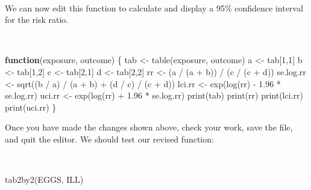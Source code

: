 \documentclass[
  12pt,
  a4paper]{book}
\newenvironment{Shaded}{\begin{snugshade}}{\end{snugshade}}
\newcommand{\ControlFlowTok}[1]{\textcolor[rgb]{0.13,0.29,0.53}{\textbf{#1}}}
\newcommand{\DecValTok}[1]{\textcolor[rgb]{0.00,0.00,0.81}{#1}}
\newcommand{\FloatTok}[1]{\textcolor[rgb]{0.00,0.00,0.81}{#1}}
\newcommand{\FunctionTok}[1]{\textcolor[rgb]{0.00,0.00,0.00}{#1}}
\newcommand{\NormalTok}[1]{#1}
\newcommand{\OtherTok}[1]{\textcolor[rgb]{0.56,0.35,0.01}{#1}}
\newcommand{\SpecialCharTok}[1]{\textcolor[rgb]{0.00,0.00,0.00}{#1}}
\begin{document}
~

We can now edit this function to calculate and display a 95\% confidence interval for the risk ratio.

~

\begin{Shaded}
\begin{Highlighting}[]
\ControlFlowTok{function}\NormalTok{(exposure, outcome) \{}
\NormalTok{  tab }\OtherTok{\textless{}{-}} \FunctionTok{table}\NormalTok{(exposure, outcome)}
\NormalTok{  a }\OtherTok{\textless{}{-}}\NormalTok{ tab[}\DecValTok{1}\NormalTok{,}\DecValTok{1}\NormalTok{]}
\NormalTok{  b }\OtherTok{\textless{}{-}}\NormalTok{ tab[}\DecValTok{1}\NormalTok{,}\DecValTok{2}\NormalTok{]}
\NormalTok{  c }\OtherTok{\textless{}{-}}\NormalTok{ tab[}\DecValTok{2}\NormalTok{,}\DecValTok{1}\NormalTok{]}
\NormalTok{  d }\OtherTok{\textless{}{-}}\NormalTok{ tab[}\DecValTok{2}\NormalTok{,}\DecValTok{2}\NormalTok{]}
\NormalTok{  rr }\OtherTok{\textless{}{-}}\NormalTok{ (a }\SpecialCharTok{/}\NormalTok{ (a }\SpecialCharTok{+}\NormalTok{ b)) }\SpecialCharTok{/}\NormalTok{ (c }\SpecialCharTok{/}\NormalTok{ (c }\SpecialCharTok{+}\NormalTok{ d))}
\NormalTok{  se.log.rr }\OtherTok{\textless{}{-}} \FunctionTok{sqrt}\NormalTok{((b }\SpecialCharTok{/}\NormalTok{ a) }\SpecialCharTok{/}\NormalTok{ (a }\SpecialCharTok{+}\NormalTok{ b) }\SpecialCharTok{+}\NormalTok{ (d }\SpecialCharTok{/}\NormalTok{ c) }\SpecialCharTok{/}\NormalTok{ (c }\SpecialCharTok{+}\NormalTok{ d)) }
\NormalTok{  lci.rr }\OtherTok{\textless{}{-}} \FunctionTok{exp}\NormalTok{(}\FunctionTok{log}\NormalTok{(rr) }\SpecialCharTok{{-}} \FloatTok{1.96} \SpecialCharTok{*}\NormalTok{ se.log.rr)}
\NormalTok{  uci.rr }\OtherTok{\textless{}{-}} \FunctionTok{exp}\NormalTok{(}\FunctionTok{log}\NormalTok{(rr) }\SpecialCharTok{+} \FloatTok{1.96} \SpecialCharTok{*}\NormalTok{ se.log.rr)}
  \FunctionTok{print}\NormalTok{(tab)}
  \FunctionTok{print}\NormalTok{(rr)}
  \FunctionTok{print}\NormalTok{(lci.rr)}
  \FunctionTok{print}\NormalTok{(uci.rr)}
\NormalTok{\}}
\end{Highlighting}
\end{Shaded}

\newpage

Once you have made the changes shown above, check your work, save the file, and quit the editor. We should test our revised function:

~

\begin{Shaded}
\begin{Highlighting}[]
\FunctionTok{tab2by2}\NormalTok{(EGGS, ILL)}
\end{Highlighting}
\end{Shaded}
\end{document}
